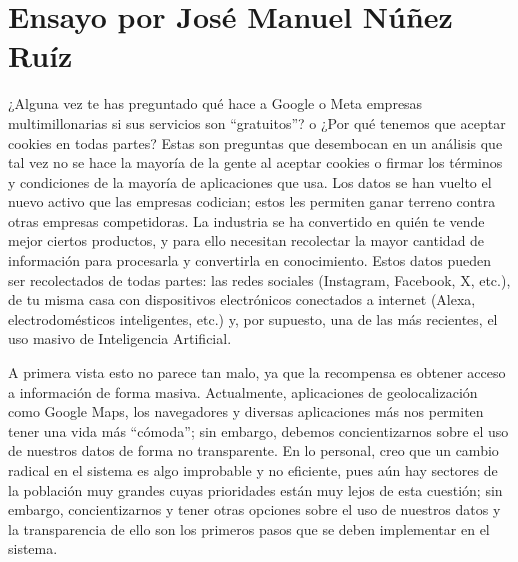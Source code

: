 \section*{Ensayo por José Manuel Núñez Ruíz}

¿Alguna vez te has preguntado qué hace a Google o Meta empresas multimillonarias si sus servicios son ``gratuitos''? o ¿Por qué tenemos que aceptar cookies en todas partes? Estas son preguntas que desembocan en un análisis que tal vez no se hace la mayoría de la gente al aceptar cookies o firmar los términos y condiciones de la mayoría de aplicaciones que usa. Los datos se han vuelto el nuevo activo que las empresas codician; estos les permiten ganar terreno contra otras empresas competidoras. La industria se ha convertido en quién te vende mejor ciertos productos, y para ello necesitan recolectar la mayor cantidad de información para procesarla y convertirla en conocimiento. Estos datos pueden ser recolectados de todas partes: las redes sociales (Instagram, Facebook, X, etc.), de tu misma casa con dispositivos electrónicos conectados a internet (Alexa, electrodomésticos inteligentes, etc.) y, por supuesto, una de las más recientes, el uso masivo de Inteligencia Artificial.

A primera vista esto no parece tan malo, ya que la recompensa es obtener acceso a información de forma masiva. Actualmente, aplicaciones de geolocalización como Google Maps, los navegadores y diversas aplicaciones más nos permiten tener una vida más ``cómoda''; sin embargo, debemos concientizarnos sobre el uso de nuestros datos de forma no transparente. En lo personal, creo que un cambio radical en el sistema es algo improbable y no eficiente, pues aún hay sectores de la población muy grandes cuyas prioridades están muy lejos de esta cuestión; sin embargo, concientizarnos y tener otras opciones sobre el uso de nuestros datos y la transparencia de ello son los primeros pasos que se deben implementar en el sistema.


